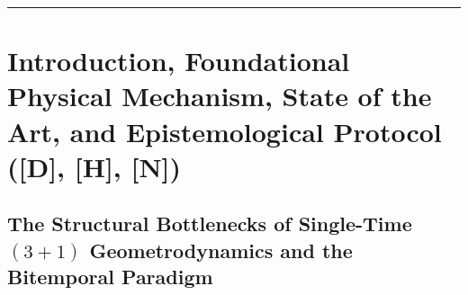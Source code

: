 \documentclass[11pt,a4paper]{article}
\newcommand{\catD}{\textbf{\textcolor{blue!75!black}{[D]}}}
\newcommand{\catH}{\textbf{\textcolor{orange!85!black}{[H]}}}
\newcommand{\catN}{\textbf{\textcolor{teal!75!black}{[N]}}}
\theoremstyle{definition}
\theoremstyle{remark}
\begin{document}
\vspace{0.12cm}
\hrule
\vspace{0.28cm}

\section{\texorpdfstring{Introduction, Foundational Physical Mechanism, State of the Art, and Epistemological Protocol (\catD, \catH, \catN)}{Introduction, Foundational Physical Mechanism, State of the Art, and Epistemological Protocol}}

\subsection{\texorpdfstring{The Structural Bottlenecks of Single-Time $(3+1)$ Geometrodynamics and the Bitemporal Paradigm}{The Structural Bottlenecks of Single-Time (3+1) Geometrodynamics and the Bitemporal Paradigm}}
\end{document}
